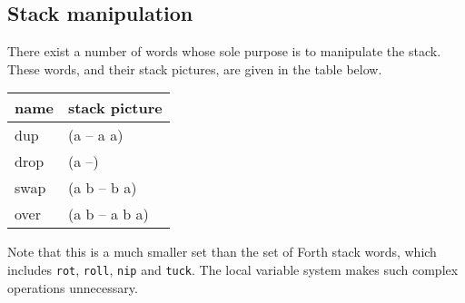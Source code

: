 \subsection{Stack manipulation}
There exist a number of words whose sole purpose is to manipulate
the stack. These words, and their stack pictures, are given in the table
below.
\begin{center}
\begin{tabular}{|l|p{4in}|}\hline
\textbf{name} & \textbf{stack picture}\\ \hline
dup & (a -- a a)\\
drop & (a --)\\
swap & (a b -- b a)\\
over & (a b -- a b a)\\
\hline
\end{tabular}
\end{center}
Note that this is a much smaller set than the set of Forth stack
words, which includes \texttt{rot}, \texttt{roll}, \texttt{nip} and \texttt{tuck}.
The local variable system makes such complex operations unnecessary.

